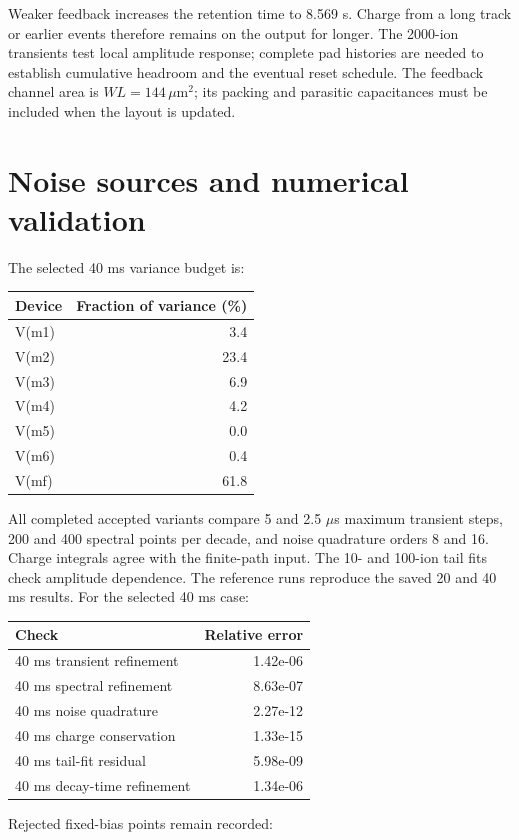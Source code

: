 \documentclass[11pt,a4paper]{article}
\begin{document}
Weaker feedback increases the retention time to 8.569 s. Charge from a long
track or earlier events therefore remains on the output for longer. The
2000-ion transients test local amplitude response; complete pad histories
are needed to establish cumulative headroom and the eventual reset schedule.
The feedback channel area is $WL=144\,\mu\mathrm{m}^2$; its packing and parasitic
capacitances must be included when the layout is updated.

\section{Noise sources and numerical validation}
The selected 40 ms variance budget is:
\begin{center}\begin{tabular}{lr}\toprule
Device & Fraction of variance (\%)\\\midrule
V(m1) & 3.4 \\
V(m2) & 23.4 \\
V(m3) & 6.9 \\
V(m4) & 4.2 \\
V(m5) & 0.0 \\
V(m6) & 0.4 \\
V(mf) & 61.8 \\
\bottomrule\end{tabular}\end{center}
All completed accepted variants compare 5 and 2.5 $\mu$s maximum transient
steps, 200 and 400 spectral points per decade, and noise quadrature orders
8 and 16. Charge integrals agree with the finite-path input. The 10- and
100-ion tail fits check amplitude dependence. The reference runs reproduce
the saved 20 and 40 ms results. For the selected 40 ms case:
\begin{center}\begin{tabular}{lr}\toprule
Check & Relative error\\\midrule
40 ms transient refinement & 1.42e-06 \\
40 ms spectral refinement & 8.63e-07 \\
40 ms noise quadrature & 2.27e-12 \\
40 ms charge conservation & 1.33e-15 \\
40 ms tail-fit residual & 5.98e-09 \\
40 ms decay-time refinement & 1.34e-06 \\
\bottomrule\end{tabular}\end{center}
Rejected fixed-bias points remain recorded:
\end{document}
